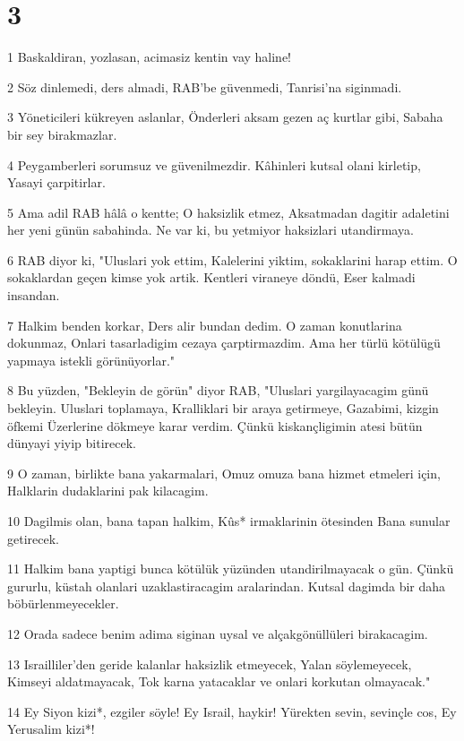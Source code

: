 \chapter{3}

\par 1 Baskaldiran, yozlasan, acimasiz kentin vay haline!
\par 2 Söz dinlemedi, ders almadi, RAB'be güvenmedi, Tanrisi'na siginmadi.
\par 3 Yöneticileri kükreyen aslanlar, Önderleri aksam gezen aç kurtlar gibi, Sabaha bir sey birakmazlar.
\par 4 Peygamberleri sorumsuz ve güvenilmezdir. Kâhinleri kutsal olani kirletip, Yasayi çarpitirlar.
\par 5 Ama adil RAB hâlâ o kentte; O haksizlik etmez, Aksatmadan dagitir adaletini her yeni günün sabahinda. Ne var ki, bu yetmiyor haksizlari utandirmaya.
\par 6 RAB diyor ki, "Uluslari yok ettim, Kalelerini yiktim, sokaklarini harap ettim. O sokaklardan geçen kimse yok artik. Kentleri viraneye döndü, Eser kalmadi insandan.
\par 7 Halkim benden korkar, Ders alir bundan dedim. O zaman konutlarina dokunmaz, Onlari tasarladigim cezaya çarptirmazdim. Ama her türlü kötülügü yapmaya istekli görünüyorlar."
\par 8 Bu yüzden, "Bekleyin de görün" diyor RAB, "Uluslari yargilayacagim günü bekleyin. Uluslari toplamaya, Kralliklari bir araya getirmeye, Gazabimi, kizgin öfkemi Üzerlerine dökmeye karar verdim. Çünkü kiskançligimin atesi bütün dünyayi yiyip bitirecek.
\par 9 O zaman, birlikte bana yakarmalari, Omuz omuza bana hizmet etmeleri için, Halklarin dudaklarini pak kilacagim.
\par 10 Dagilmis olan, bana tapan halkim, Kûs* irmaklarinin ötesinden Bana sunular getirecek.
\par 11 Halkim bana yaptigi bunca kötülük yüzünden utandirilmayacak o gün. Çünkü gururlu, küstah olanlari uzaklastiracagim aralarindan. Kutsal dagimda bir daha böbürlenmeyecekler.
\par 12 Orada sadece benim adima siginan uysal ve alçakgönüllüleri birakacagim.
\par 13 Israilliler'den geride kalanlar haksizlik etmeyecek, Yalan söylemeyecek, Kimseyi aldatmayacak, Tok karna yatacaklar ve onlari korkutan olmayacak."
\par 14 Ey Siyon kizi*, ezgiler söyle! Ey Israil, haykir! Yürekten sevin, sevinçle cos, Ey Yerusalim kizi*!
